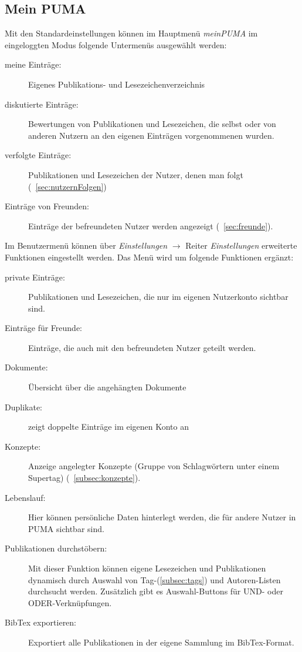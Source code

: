 \subsection*{Mein PUMA}
\label{subsec:meinPuma}
Mit den Standardeinstellungen  können im Hauptmenü \textit{meinPUMA} im eingeloggten Modus folgende Untermenüs ausgewählt werden:
\begin{description}
\item [meine Einträge:] Eigenes Publikations- und Lesezeichenverzeichnis
\item [diskutierte Einträge:] Bewertungen von Publikationen und Lesezeichen, die selbst oder von anderen Nutzern an den eigenen Einträgen vorgenommenen wurden. 
\item [verfolgte Einträge:] Publikationen und Lesezeichen der Nutzer, denen man folgt (~\autoref{sec:nutzernFolgen}) 
\item [Einträge von Freunden:] Einträge der befreundeten Nutzer werden angezeigt (~\autoref{sec:freunde}).
\end{description}
Im Benutzermenü können über \textit{Einstellungen} $\to$ Reiter \textit{Einstellungen} erweiterte Funktionen eingestellt werden. Das Menü wird um folgende Funktionen ergänzt:
\begin{description}
\item [private Einträge:] Publikationen und Lesezeichen, die nur im eigenen Nutzerkonto sichtbar sind. 
\item [Einträge für Freunde:] Einträge, die auch mit den befreundeten Nutzer geteilt werden.
\item [Dokumente:] Übersicht über die angehängten Dokumente
\item [Duplikate:] zeigt doppelte Einträge im eigenen Konto an
\item [Konzepte:] Anzeige angelegter Konzepte (Gruppe von Schlagwörtern unter einem Supertag) (~\autoref{subsec:konzepte}). 
\item [Lebenslauf:] Hier können persönliche Daten hinterlegt werden, die für andere Nutzer in PUMA sichtbar sind.
\item [Publikationen durchstöbern:] Mit dieser Funktion können eigene Lesezeichen und Publikationen dynamisch durch Auswahl von Tag-(\autoref{subsec:tags}) und Autoren-Listen durchsucht werden. Zusätzlich gibt es Auswahl-Buttons für UND- oder ODER-Verknüpfungen.
\item [BibTex exportieren:] Exportiert alle Publikationen in der eigene Sammlung im BibTex-Format.
\end{description}

